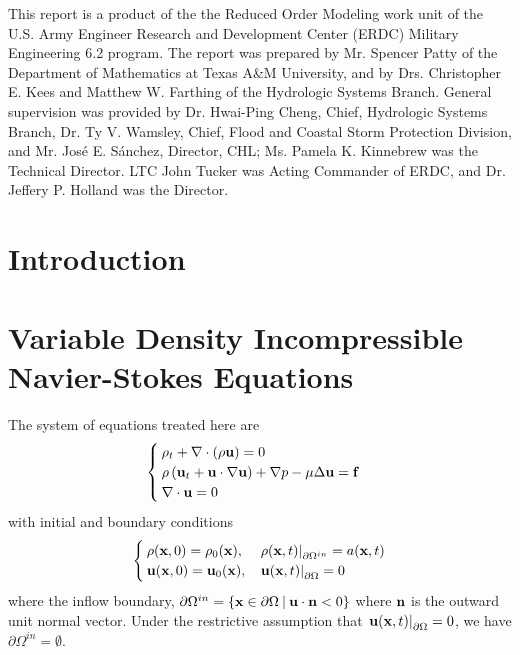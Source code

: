\documentclass[letterpaper]{erdc}
\begin{document}
This report is a product of the the Reduced Order Modeling work unit of the
U.S. Army Engineer Research and Development Center (ERDC) Military Engineering
6.2 program.  The report was prepared by Mr. Spencer Patty of the Department of
Mathematics at Texas A\&M University, and by Drs. Christopher E. Kees and
Matthew W. Farthing of the Hydrologic Systems Branch.  General supervision was
provided by Dr. Hwai-Ping Cheng, Chief, Hydrologic Systems Branch, Dr. Ty
V. Wamsley, Chief, Flood and Coastal Storm Protection Division, and
Mr. Jos\'{e} E. S\'{a}nchez, Director, CHL; Ms. Pamela K. Kinnebrew was the
Technical Director.  LTC John Tucker was Acting Commander of ERDC, and
Dr. Jeffery P. Holland was the Director.

\mainmatter

\chapter{Introduction}


%
%
%
%
\chapter{Variable Density Incompressible Navier-Stokes Equations}

The system of equations treated here are
\begin{equation}\label{eqn:variabledensityNavierStokes}
  \begin{cases}
    \rho_t + \nabla\cdot\left( \rho \textbf{u}\right) = 0 &\\
    \rho\left(\textbf{u}_t + \textbf{u}\cdot\nabla\textbf{u}  \right) + \nabla p - \mu\Delta \textbf{u} = \textbf{f} &\\
    \nabla\cdot \textbf{u} = 0
  \end{cases}
\end{equation}
with initial and boundary conditions
\begin{equation}\label{eqn:variabledensityNavierStokesBCIC}
  \begin{cases}
    \rho(\textbf{x},0) = \rho_0(\textbf{x}), & \left.\rho(\textbf{x},t)\right|_{\partial\Omega^{in}} = a(\textbf{x},t)\\
    \textbf{u}(\textbf{x},0) = \textbf{u}_0(\textbf{x}), & \left.\textbf{u}(\textbf{x},t)\right|_{\partial\Omega} = 0
  \end{cases}
\end{equation}
where the inflow boundary, $\partial\Omega^{in} = \{ \textbf{x}\in \partial\Omega \:|\: \textbf{u}\cdot\textbf{n} <0 \}$ where $\textbf{n}$ is the outward unit normal vector.  Under the restrictive assumption that $\left.\textbf{u}(\textbf{x},t)\right|_{\partial\Omega} = 0$, we have $\partial\Omega^{in}= \emptyset$.
\end{document}
